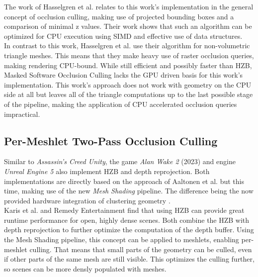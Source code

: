 \noindent
The work of Hasselgren et al. relates to this work's implementation in the general concept of occlusion culling, making 
use of projected bounding boxes and a comparison of minimal z values. Their work shows that such an algorithm can be 
optimized for \ac{CPU} execution using \ac{SIMD} and effective use of data structures. \\

\noindent 
In contrast to this work, Hasselgren et al. use their algorithm for non-volumetric triangle meshes. This means that 
they make heavy use of raster occlusion queries, making rendering CPU-bound. While still efficient and possibly faster 
than \ac{HZB}, Masked Software Occlusion Culling lacks the \ac{GPU} driven basis for this work's implementation. This 
work's approach does not work with geometry on the \ac{CPU} side at all but leaves all of the triangle computations up 
to the last possible stage of the pipeline, making the application of \ac{CPU} accelerated occlusion queries impractical.


\subsection*{Per-Meshlet Two-Pass Occlusion Culling}

Similar to \emph{Assassin's Creed Unity}, the game \emph{Alan Wake 2} (2023) and engine \emph{Unreal Engine 5} also 
implement \ac{HZB} and depth reprojection. Both implementations are directly based on the approach of Aaltonen et 
al. \cite{Aaltonen2015} but this time, making use of the new \emph{Mesh Shading} pipeline. The difference being the 
now provided hardware integration of clustering geometry \cite{Remedy2023,Karis2021}.  \\

\noindent
Karis et al. and Remedy Entertainment find that using \ac{HZB} can provide great runtime performance for open, 
highly dense scenes. Both combine the \ac{HZB} with depth reprojection to further optimize the computation of the 
depth buffer. Using the Mesh Shading pipeline, this concept can be applied to meshlets, enabling per-meshlet culling. 
That means that small parts of the geometry can be culled, even if other parts of the same mesh are still visible. 
This optimizes the culling further, so scenes can be more densly populated with meshes.\\


